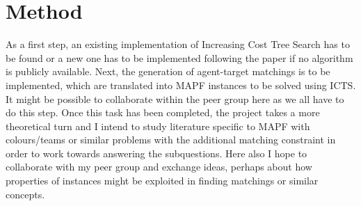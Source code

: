 \documentclass[a4paper,10pt,english]{article}
\begin{document}
\section*{Method}
As a first step, an existing implementation of Increasing Cost Tree Search has to be found or a new one has to be implemented following the paper if no algorithm is publicly available. Next, the generation of agent-target matchings is to be implemented, which are translated into MAPF instances to be solved using ICTS. It might be possible to collaborate within the peer group here as we all have to do this step. Once this task has been completed, the project takes a more theoretical turn and I intend to study literature specific to MAPF with colours/teams or similar problems with the additional matching constraint in order to work towards answering the subquestions. Here also I hope to collaborate with my peer group and exchange ideas, perhaps about how properties of instances might be exploited in finding matchings or similar concepts.
\end{document}
